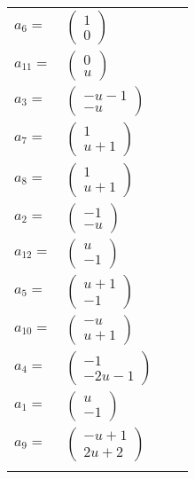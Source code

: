 \documentclass[1p]{elsarticle_modified}
\theoremstyle{definition}
\begin{document}
\begin{tabular}{m{7pt} m{180pt} m{7pt} m{180pt} }
\flushright $a_{6}=$&$\begin{pmatrix}1\\0\end{pmatrix}$ \\
\flushright $a_{11}=$&$\begin{pmatrix}0\\u\end{pmatrix}$ \\
\flushright $a_{3}=$&$\begin{pmatrix}- u-1\\- u\end{pmatrix}$ \\
\flushright $a_{7}=$&$\begin{pmatrix}1\\u+1\end{pmatrix}$ \\
\flushright $a_{8}=$&$\begin{pmatrix}1\\u+1\end{pmatrix}$ \\
\flushright $a_{2}=$&$\begin{pmatrix}-1\\- u\end{pmatrix}$ \\
\flushright $a_{12}=$&$\begin{pmatrix}u\\-1\end{pmatrix}$ \\
\flushright $a_{5}=$&$\begin{pmatrix}u+1\\-1\end{pmatrix}$ \\
\flushright $a_{10}=$&$\begin{pmatrix}- u\\u+1\end{pmatrix}$ \\
\flushright $a_{4}=$&$\begin{pmatrix}-1\\-2 u-1\end{pmatrix}$ \\
\flushright $a_{1}=$&$\begin{pmatrix}u\\-1\end{pmatrix}$ \\
\flushright $a_{9}=$&$\begin{pmatrix}- u+1\\2 u+2\end{pmatrix}$\\&\end{tabular}
\end{document}
